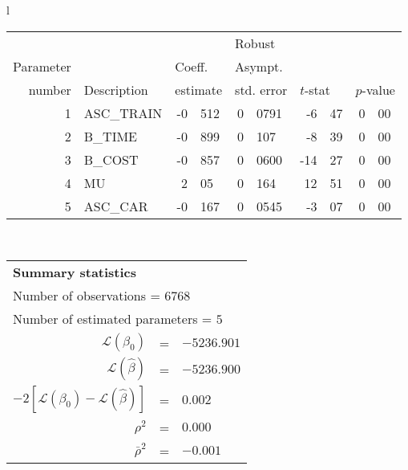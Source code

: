   \begin{tabular}{l}
\begin{tabular}{rlr@{.}lr@{.}lr@{.}lr@{.}l}
         &                       &   \multicolumn{2}{l}{}    & \multicolumn{2}{l}{Robust}  &     \multicolumn{4}{l}{}   \\
Parameter &                       &   \multicolumn{2}{l}{Coeff.}      & \multicolumn{2}{l}{Asympt.}  &     \multicolumn{4}{l}{}   \\
number &  Description                     &   \multicolumn{2}{l}{estimate}      & \multicolumn{2}{l}{std. error}  &   \multicolumn{2}{l}{$t$-stat}  &   \multicolumn{2}{l}{$p$-value}   \\

\hline

1 & ASC_TRAIN & -0&512 & 0&0791 & -6&47 & 0&00\\
2 & B_TIME & -0&899 & 0&107 & -8&39 & 0&00\\
3 & B_COST & -0&857 & 0&0600 & -14&27 & 0&00\\
4 & MU & 2&05 & 0&164 & 12&51 & 0&00\\
5 & ASC_CAR & -0&167 & 0&0545 & -3&07 & 0&00\\
\hline
\end{tabular}
\\
\begin{tabular}{rcl}
\multicolumn{3}{l}{\bf Summary statistics}\\
\multicolumn{3}{l}{ Number of observations = $6768$} \\
\multicolumn{3}{l}{ Number of estimated  parameters = $5$} \\
 $\mathcal{L}(\beta_0)$ &=&  $-5236.901$ \\
 $\mathcal{L}(\hat{\beta})$ &=& $-5236.900 $  \\
 $-2[\mathcal{L}(\beta_0) -\mathcal{L}(\hat{\beta})]$ &=& $0.002$ \\
    $\rho^2$ &=&   $0.000$ \\
    $\bar{\rho}^2$ &=&    $-0.001$ \\
\end{tabular}
  \end{tabular}
